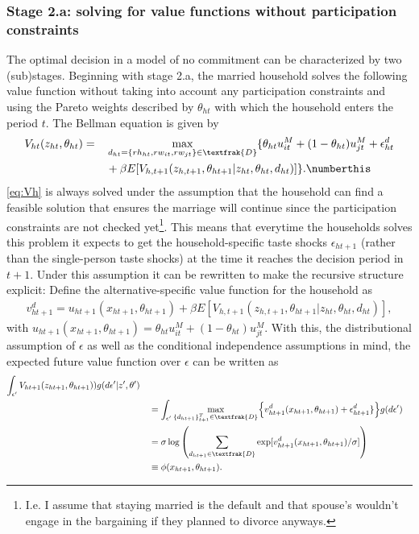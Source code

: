\subsubsection{Stage 2.a: solving for value functions without participation constraints} \label{sec:2a}
The optimal decision in a model of no commitment can be characterized by two (sub)stages. Beginning with stage 2.a, the married household solves the following value function without taking into account any participation constraints and using the Pareto weights described by $\theta_{ht}$ with which the household enters the period $t$. The Bellman equation is given by
\begin{alignat*}{3}
&V_{ht}(z_{ht},\theta_{ht})=&&\max_{d_{ht}=\{rh_{ht},rw_{it},rw_{jt}\}\in \textfrak{D}} \{\theta_{ht} u_{it}^M+(1-\theta_{ht})u_{jt}^M+\epsilon_{ht}^d \\
& &&+\beta E[V_{h,t+1}(z_{h,t+1},\theta_{ht+1}|z_{ht},\theta_{ht},d_{ht})]\}. \numberthis
\label{eq:Vh}
\end{alignat*}
\eqref{eq:Vh} is always solved under the assumption that the household can find a feasible solution that ensures the marriage will continue since the participation constraints are not checked yet\footnote{I.e. I assume that staying married is the default and that spouse's wouldn't engage in the bargaining if they planned to divorce anyways.}. This means that everytime the households solves this problem it expects to get the household-specific taste shocks $\epsilon_{ht+1}$ (rather than the single-person taste shocks) at the time it reaches the decision period in $t+1$. Under this assumption it can be rewritten to make the recursive structure explicit: Define the alternative-specific value function for the household as
\begin{align}
v_{ht+1}^d=u_{ht+1}(x_{ht+1},\theta_{ht+1})+\beta E[V_{h,t+1}(z_{h,t+1},\theta_{ht+1}|z_{ht},\theta_{ht},d_{ht})],
\label{eq:vh}
\end{align}
with $u_{ht+1}(x_{ht+1},\theta_{ht+1})=\theta_{ht} u_{it}^M+(1-\theta_{ht})u_{jt}^M$. With this, the distributional assumption of $\epsilon$ as well as the conditional independence assumptions in mind, the expected future value function over $\epsilon$ can be written as
\begin{alignat*}{3}
\int_{\epsilon'}{ V_{ht+1}(z_{ht+1},\theta_{ht+1}))g(d\epsilon'|z',\theta')} \\
& &&= \int_{\epsilon'}{ \max_{\{d_{ht+1}\}_{t+1}^{T}\in \textfrak{D}_{}} } \Big\{v_{ht+1}^{d_{}}(x_{ht+1},\theta_{ht+1}) +\epsilon_{ht+1}^{d_{}}\} \Big\}g(d\epsilon') \\
& &&=\sigma \log {\left( \sum_{d_{ht+1} \in \textfrak{D}} { \exp[v_{ht+1}^{d_{}}(x_{ht+1},\theta_{ht+1})/ \sigma]  } \right)} \\
& &&\equiv\phi(x_{ht+1},\theta_{ht+1}). 
\end{alignat*}
